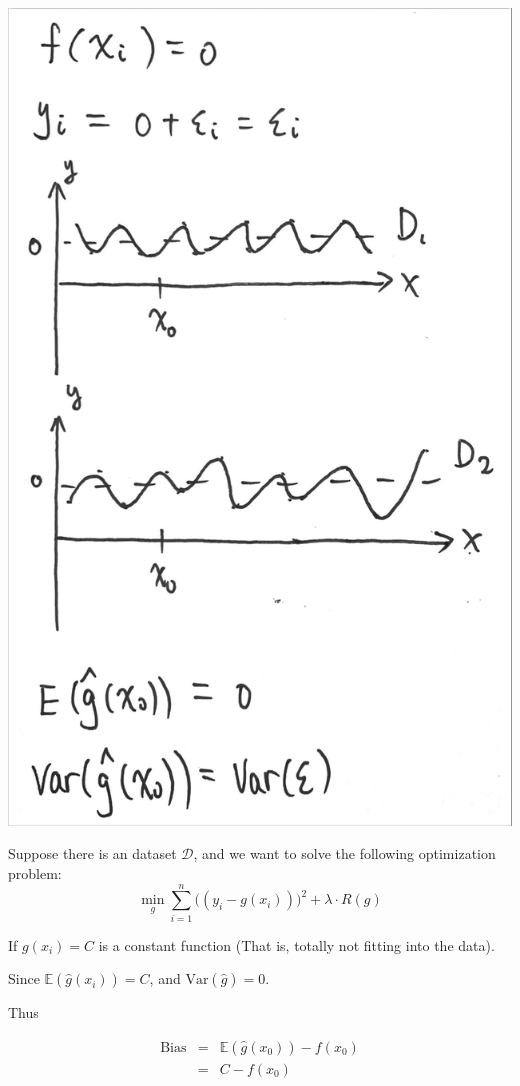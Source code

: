 \documentclass{article}
\theoremstyle{MyNonumberplain}
\theoremstyle{break}
\newcommand{\ev}{\mathbb{E}}
\newcommand{\var}{\text{Var}}
\newcommand{\bias}{\text{Bias}}
\theoremstyle{break}
\theoremstyle{break}
\theoremstyle{break}
\begin{document}
\begin{center}
    \includegraphics*[scale=0.1]{img5.jpg}
\end{center}

Suppose there is an dataset $\mathcal{D}$, and we want to solve the following optimization problem: $$\min_g\sum_{i=1}^{n}\bigl((y_i-g(x_i))\bigr)^2+\lambda\cdot R(g)$$

If $g(x_i)=C$ is a constant function (That is, totally not fitting into the data).

Since $\ev(\hat{g}(x_i))=C$, and $\var(\hat{g})=0$.

Thus 

\begin{eqnarray*}
    \bias &=&\ev(\hat{g}(x_0))-f(x_0)\\
          &=& C-f(x_0)
\end{eqnarray*}
\end{document}

